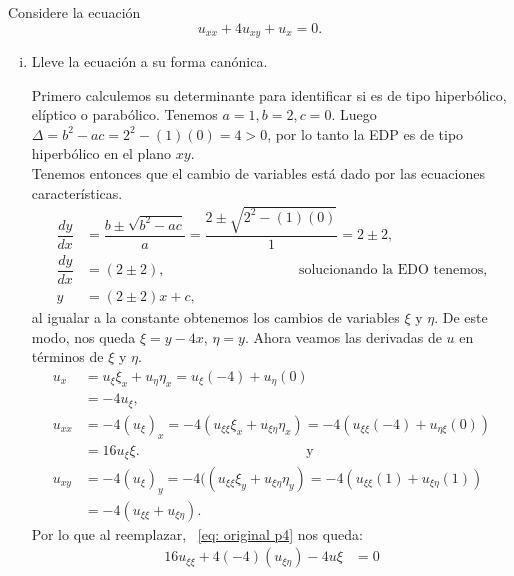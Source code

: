 \begin{homeworkProblem}
Considere la ecuación 
\begin{equation}
    \label{eq: original p4}
    u_{xx}+4u_{xy}+u_{x} = 0.
\end{equation}
\begin{enumerate}[(i)]
    \item Lleve la ecuación a su forma canónica.
    \begin{solucion}
        Primero calculemos su determinante para identificar si es de tipo hiperbólico, elíptico o parabólico. Tenemos $a=1, b=2, c=0$. Luego $\Delta = b^{2}-ac = 2^{2} -(1)(0) = 4>0$, por lo tanto la EDP es de tipo hiperbólico en el plano $xy$.\\
        Tenemos entonces que el cambio de variables está dado por las ecuaciones características.
        \begin{align}
            \dfrac{dy}{dx} &= \dfrac{b \pm \sqrt{b^2-ac}}{a} = \dfrac{2 \pm \sqrt{2^2-(1)(0)}}{1} =2 \pm 2,\\
            \dfrac{dy}{dx} &=(2 \pm 2), \hspace{4cm}\text{solucionando la EDO tenemos,}\\
            y &= (2 \pm 2)x + c,
        \end{align}
        al igualar a la constante obtenemos los cambios de variables $\xi \text{ y } \eta$. De este modo, nos queda $\xi = y - 4x$, $\eta = y$. Ahora veamos las derivadas de $u$ en términos de $\xi$ y $\eta$.
        \begin{align*}
            u_{x} &= u_{\xi}\xi_{x} + u_{\eta}\eta_{x} = u_{\xi}(-4) + u_{\eta}(0)\\ 
            &= -4u_{\xi},\\
            u_{xx} &= -4(u_{\xi})_{x} = -4(u_{\xi \xi} \xi_{x} + u_{\xi \eta} \eta_{x}) = -4(u_{\xi \xi}(-4) + u_{\eta \xi}(0))\\
            &= 16u{_\xi \xi}. \hspace{5cm} \text{y}\\
            u_{xy} &= -4(u_{\xi})_{y} = -4((u_{\xi \xi} \xi_{y} + u_{\xi \eta} \eta_{y}) = -4 (u_{\xi\xi}(1) + u_{\xi \eta}(1))\\ 
            &= -4 (u_{\xi\xi} + u_{\xi \eta}).
        \end{align*}
        Por lo que al reemplazar, ~\ref{eq: original p4} nos queda:
        \begin{align*}
            16u_{\xi \xi} + 4(-4)(u_{\xi \eta}) -4u{\xi}&= 0\\

\end{align*}
\end{solucion}
\end{enumerate}
\end{homeworkProblem}
